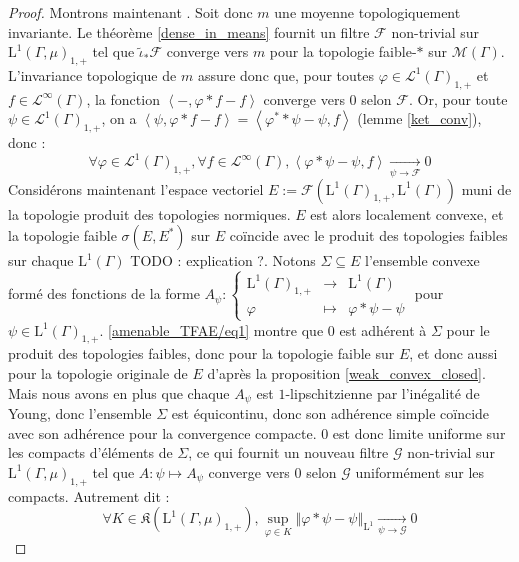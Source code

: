 \documentclass[a4paper,12pt]{article}
\newcommand{\norm}[1]{\left\Vert #1\right\Vert}
\newcommand{\ket}[1]{\left\langle #1 \right\rangle}
\newcommand\fundef[3]{#1: \left\{\begin{array}{ccc}#2\\#3\end{array}\right.}
\renewcommand{\implies}{\Rightarrow}
\newcommand{\blank}{{-}}
\newcommand{\TODO}[1]{{\color{red}TODO :} #1}
\begin{document}
\begin{proof}
    Montrons maintenant \framebox{$(\ref{amenable_TFAE/topological_mean})\implies(\ref{amenable_TFAE/strong_Reiter})$}. Soit donc $m$ une moyenne topologiquement invariante.
    Le théorème \ref{dense_in_means} fournit un filtre $\mathscr{F}$ non-trivial sur $\mathrm{L}^1(\Gamma, \mu)_{1, +}$
    tel que $\widetilde{\iota}_*\mathscr{F}$ converge vers $m$ pour la topologie faible-$*$ sur $\mathcal{M}(\Gamma)$.
    L'invariance topologique de $m$ assure donc que, pour toutes $\varphi\in\mathscr{L}^1(\Gamma)_{1, +}$ et 
    $f\in\mathscr{L}^\infty(\Gamma)$, la fonction $\ket{\blank, \varphi\ast f - f}$ converge vers $0$ selon $\mathscr{F}$.
    Or, pour toute $\psi\in\mathscr{L}^1(\Gamma)_{1, +}$, on a $\ket{\psi, \varphi\ast f - f} = \ket{\varphi^*\ast\psi - \psi, f}$ (lemme \ref{ket_conv}),
    donc :
    \begin{equation}\label{amenable_TFAE/eq1}
        \forall\varphi\in\mathscr{L}^1(\Gamma)_{1, +}, \forall f\in\mathscr{L}^\infty(\Gamma), \ket{\varphi\ast\psi - \psi, f}\xrightarrow[\psi\to\mathscr{F}]{}0
    \end{equation}
    Considérons maintenant l'espace vectoriel $E := \mathcal{F}(\mathrm{L}^1(\Gamma)_{1, +}, \mathrm{L}^1(\Gamma))$ muni de la topologie 
    produit des topologies normiques. $E$ est alors localement convexe, et la topologie faible $\sigma(E, E^*)$ sur $E$
    coïncide avec le produit des topologies faibles sur chaque $\mathrm{L}^1(\Gamma)$ \TODO{explication ?}. Notons $\Sigma\subseteq E$ l'ensemble convexe formé
    des fonctions de la forme $\fundef{A_\psi}{\mathrm{L}^1(\Gamma)_{1, +}&\to&\mathrm{L}^1(\Gamma)}{\varphi&\mapsto&\varphi\ast\psi - \psi}$ pour $\psi\in\mathrm{L}^1(\Gamma)_{1, +}$.
    \eqref{amenable_TFAE/eq1} montre que $0$ est adhérent à $\Sigma$ pour le produit des topologies faibles, 
    donc pour la topologie faible sur $E$, et donc aussi pour la topologie originale de $E$ d'après la proposition \ref{weak_convex_closed}.
    Mais nous avons en plus que chaque $A_\psi$ est $1$-lipschitzienne par l'inégalité de Young, donc l'ensemble
    $\Sigma$ est équicontinu, donc son adhérence simple coïncide avec son adhérence pour la convergence compacte.
    $0$ est donc limite uniforme sur les compacts d'éléments de $\Sigma$, ce qui fournit un nouveau filtre $\mathscr{G}$ non-trivial sur $\mathrm{L}^1(\Gamma, \mu)_{1, +}$ 
    tel que $A:\psi\mapsto A_\psi$ converge vers $0$ selon $\mathscr{G}$ uniformément sur les compacts. Autrement dit :
    \begin{equation}\label{amenable_TFAE/eq2}
        \forall K\in\mathfrak{K}(\mathrm{L}^1(\Gamma, \mu)_{1, +}), \sup_{\varphi\in K}\norm{\varphi\ast\psi - \psi}_{\mathrm{L}^1} \xrightarrow[\psi\to\mathscr{G}]{} 0
    \end{equation}


\end{proof}
\end{document}
